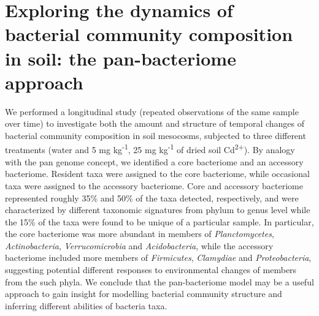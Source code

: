 \section{Exploring the dynamics of bacterial community composition in soil: the pan-bacteriome approach}
We performed a longitudinal study (repeated observations of the same sample over time) to investigate both the amount and structure of temporal changes of bacterial community composition in soil mesocosms, subjected to three different treatments (water and 5 mg kg\textsuperscript{-1}, 25 mg kg\textsuperscript{-1} of dried soil Cd\textsuperscript{2+}). By analogy with the pan genome concept, we identified a core bacteriome and an accessory bacteriome. Resident taxa were assigned to the core bacteriome, while occasional taxa were assigned to the accessory bacteriome. Core and accessory bacteriome represented roughly 35\% and 50\% of the taxa detected, respectively, and were characterized by different taxonomic signatures from phylum to genus level while the 15\% of the taxa were found to be unique of a particular sample. In particular, the core bacteriome was more abundant in members of \textit{Planctomycetes}, \textit{Actinobacteria}, \textit{Verrucomicrobia} and \textit{Acidobacteria}, while the accessory bacteriome included more members of \textit{Firmicutes}, \textit{Clamydiae} and \textit{Proteobacteria}, suggesting potential different responses to environmental changes of members from the such phyla. We conclude that the pan-bacteriome model may be a useful approach to gain insight for modelling bacterial community structure and inferring different abilities of bacteria taxa.\\

